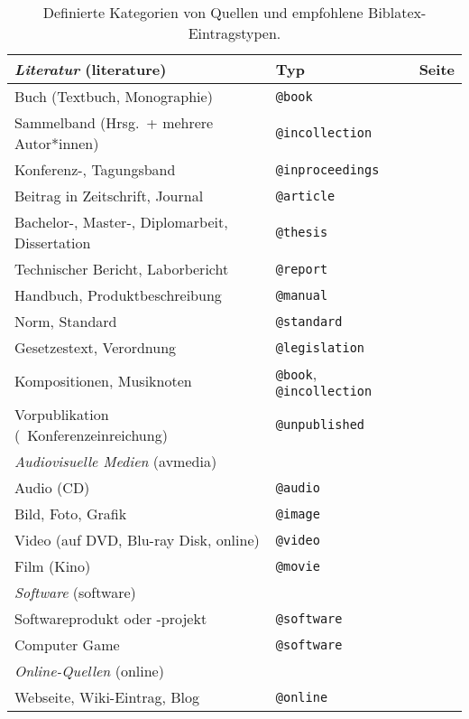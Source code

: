 \begin{table}
\caption{Definierte Kategorien von Quellen und empfohlene Biblatex-Eintragstypen.}
\label{tab:QuellenUndEintragstypen}
\centering
\begin{tabular}{@{}llc@{}}
	\toprule
	\emph{Literatur} (\textsf{literature}) & Typ & Seite\\
	\midrule
	Buch (Textbuch, Monographie) & \texttt{@book} & \pageref{sec:@book}\\
	Sammelband (Hrsg.\ + mehrere Autor*innen) & \texttt{@incollection} & \pageref{sec:@incollection} \\
	Konferenz-, Tagungsband & \texttt{@inproceedings} & \pageref{sec:@inproceedings}\\
	Beitrag in Zeitschrift, Journal & \texttt{@article} & \pageref{sec:@article}\\
	Bachelor-, Master-, Diplomarbeit, Dissertation & \texttt{@thesis} & \pageref{sec:@thesis}\\
	Technischer Bericht, Laborbericht & \texttt{@report} & \pageref{sec:@report}\\
	Handbuch, Produktbeschreibung & \texttt{@manual} & \pageref{sec:@manual}\\
	Norm, Standard & \texttt{@standard} & \pageref{sec:@standard}\\
	Gesetzestext, Verordnung \etc & \texttt{@legislation} & \pageref{sec:@legislation}\\
	Kompositionen, Musiknoten & \texttt{@book}, \texttt{@incollection} & \pageref{sec:Musiknoten}\\
	Vorpublikation (\zB\ Konferenzeinreichung) & \texttt{@unpublished} & \pageref{sec:@unpublished}\\
	\addlinespace
%
	\midrule
	\emph{Audiovisuelle Medien} (\textsf{avmedia}) & & \\
	\midrule
	Audio (CD) & \texttt{@audio} & \pageref{sec:@audio}\\
	Bild, Foto, Grafik & \texttt{@image} & \pageref{sec:@image}\\
	Video (auf DVD, Blu-ray Disk, online) & \texttt{@video} & \pageref{sec:@video}\\
	Film (Kino) & \texttt{@movie} & \pageref{sec:@movie}\\
	\addlinespace
%
	\midrule
	\emph{Software} (\textsf{software}) & & \\
	\midrule
	Softwareprodukt oder -projekt & \texttt{@software} & \pageref{sec:@software}\\
	Computer Game & \texttt{@software} & \pageref{sec:@software}\\
	\addlinespace
%
	\midrule
	\emph{Online-Quellen} (\textsf{online}) & & \\
	\midrule
	Webseite, Wiki-Eintrag, Blog \etc & \texttt{@online} & \pageref{sec:@online-www} \\
	\bottomrule
\end{tabular}
\end{table}

